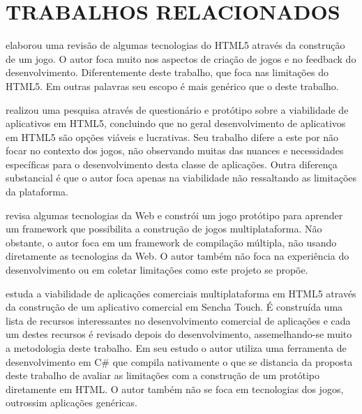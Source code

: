 
\section{TRABALHOS RELACIONADOS}
\citet{crossPlatformMobileGame} elaborou uma revisão de algumas
tecnologias do HTML5 através da construção de um jogo. O autor foca
muito nos aspectos de criação de jogos e no feedback do desenvolvimento.
Diferentemente deste trabalho, que foca nas limitações do HTML5. Em
outras palavras seu escopo é mais genérico que o deste trabalho.

\citet{aSeriousContender} realizou uma pesquisa através de questionário
e protótipo sobre a viabilidade de aplicativos em HTML5, concluindo que
no geral desenvolvimento de aplicativos em HTML5 são opções viáveis
e lucrativas. Seu trabalho difere a este por não focar no contexto dos
jogos, não observando muitas das nuances e necessidades específicas
para o desenvolvimento desta classe de aplicações. Outra diferença substancial é que o
autor foca apenas na viabilidade não ressaltando as limitações da
plataforma.

\citet{crossPlatformMobileGameDevelopment} revisa algumas tecnologias
da Web e constrói um jogo protótipo para aprender um framework que
possibilita a construção de jogos multiplataforma. Não obstante,
o autor foca em um framework de compilação múltipla, não usando
diretamente as tecnologias da Web. O autor também não foca na experiência do
desenvolvimento ou em coletar limitações como este projeto se propõe.

\citet{viabilityBusinessApplications} estuda a viabilidade de
aplicações comerciais multiplataforma em HTML5 através da
construção de um aplicativo comercial em Sencha Touch. É construída
uma lista de recursos interessantes no desenvolvimento comercial
de aplicações e cada um destes recursos é revisado depois do
desenvolvimento, assemelhando-se muito a metodologia deste trabalho. Em
seu estudo o autor utiliza uma ferramenta de desenvolvimento em C\# que
compila nativamente o que se distancia da proposta deste trabalho de
avaliar as limitações com a construção de um protótipo diretamente
em HTML. O autor também não se foca em tecnologias dos jogos,
outrossim aplicações genéricas.


